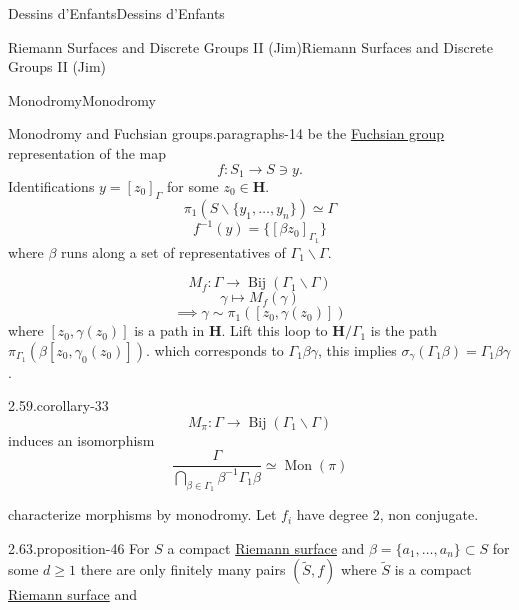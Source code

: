 \documentclass[10pt,]{book}
\numberwithin{equation}{section}
\newcommand{\inv}{^{-1}}
\newcommand{\lb}{[}
\newcommand{\rb}{]}
\newcommand{\HH}{\mathbf{H}}
\begin{document}
\begin{chapterptx}{Dessins d'Enfants}{}{Dessins d'Enfants}{}{}
\begin{sectionptx}{Riemann Surfaces and Discrete Groups II (Jim)}{}{Riemann Surfaces and Discrete Groups II (Jim)}{}{}
\begin{subsectionptx}{Monodromy}{}{Monodromy}{}{}
\begin{paragraphs}{Monodromy and Fuchsian groups.}{paragraphs-14}
be the \hyperref[def-fuchsian-group]{Fuchsian group} representation of the map%
\begin{equation*}
f\colon S_1 \to S\ni y\text{.}
\end{equation*}
Identifications \(y = \lb z_0 \rb_\Gamma\) for some \(z_0 \in \HH\).%
\begin{equation*}
\pi_1 (S\smallsetminus \{y_1,\ldots, y_n\}) \simeq \Gamma
\end{equation*}
%
\begin{equation*}
f\inv(y ) = \{ [\beta z_0]_{\Gamma_1}\}
\end{equation*}
where \(\beta\) runs along a set of representatives of \(\Gamma_1\backslash \Gamma\).%
\par
\hypertarget{p-580}{}%
%
\begin{equation*}
M_f \colon \Gamma \to \operatorname{Bij} (\Gamma_1\backslash \Gamma)
\end{equation*}
%
\begin{equation*}
\gamma \mapsto M_f(\gamma)
\end{equation*}
%
\begin{equation*}
\implies \gamma \sim \pi_1([z_0,\gamma(z_0)])
\end{equation*}
where \(\lb z_0, \gamma(z_0) \rb\) is a path in \(\HH\). Lift this loop to \(\HH/\Gamma_1\) is the path \(\pi_{\Gamma_1}(\beta \lb z_0, \gamma_0(z_0)\rb)\). which corresponds to \(\Gamma_1 \beta \gamma\), this implies \(\sigma_\gamma(\Gamma_1\beta)  = \Gamma_1 \beta\gamma\).%
\begin{corollary}{2.59.}{}{corollary-33}%
\hypertarget{p-581}{}%
%
\begin{equation*}
M_\pi \colon \Gamma \to \operatorname{Bij} (\Gamma_1 \backslash \Gamma)
\end{equation*}
induces an isomorphism%
\begin{equation*}
\frac{\Gamma}{\bigcap_{\beta\in \Gamma_1} \beta\inv \Gamma_1 \beta} \simeq \operatorname{Mon}(\pi)
\end{equation*}
%
\end{corollary}
\hypertarget{p-582}{}%
characterize morphisms by monodromy. Let \(f_i\) have degree 2, non conjugate.%
\begin{proposition}{2.63.}{}{proposition-46}%
\hypertarget{p-583}{}%
For \(S\) a compact \hyperref[def-top-riem-surface]{Riemann surface} and \(\beta = \{ a_1, \ldots, a_n\} \subset S\) for some \(d \ge 1\) there are only finitely many pairs \((\tilde S, f)\) where \(\tilde S\) is a compact \hyperref[def-top-riem-surface]{Riemann surface} and%

\end{proposition}
\end{paragraphs}
\end{subsectionptx}
\end{sectionptx}
\end{chapterptx}
\end{document}
